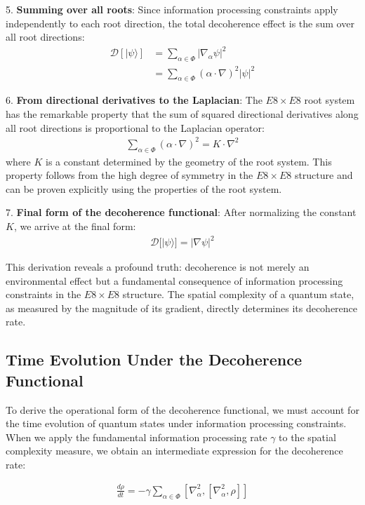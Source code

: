 \documentclass[11pt,english,twoside]{article}
\begin{document}
5. \textbf{Summing over all roots}: Since information processing constraints apply independently to each root direction, the total decoherence effect is the sum over all root directions:
   \begin{align}
   \mathcal{D}[|\psi\rangle] &= \sum_{\alpha \in \Phi} |\nabla_\alpha\psi|^2\\
   &= \sum_{\alpha \in \Phi} (\alpha \cdot \nabla)^2|\psi|^2
   \end{align}

6. \textbf{From directional derivatives to the Laplacian}: The $E8\times E8$ root system has the remarkable property that the sum of squared directional derivatives along all root directions is proportional to the Laplacian operator:
   \begin{align}
   \sum_{\alpha \in \Phi} (\alpha \cdot \nabla)^2 = K \cdot \nabla^2
   \end{align}
   where $K$ is a constant determined by the geometry of the root system. This property follows from the high degree of symmetry in the $E8\times E8$ structure and can be proven explicitly using the properties of the root system.

7. \textbf{Final form of the decoherence functional}: After normalizing the constant $K$, we arrive at the final form:
   \begin{align}
   \mathcal{D}[|\psi\rangle] = |\nabla\psi|^2
   \end{align}

This derivation reveals a profound truth: decoherence is not merely an environmental effect but a fundamental consequence of information processing constraints in the $E8\times E8$ structure. The spatial complexity of a quantum state, as measured by the magnitude of its gradient, directly determines its decoherence rate.

\subsection{Time Evolution Under the Decoherence Functional}

To derive the operational form of the decoherence functional, we must account for the time evolution of quantum states under information processing constraints. When we apply the fundamental information processing rate $\gamma$ to the spatial complexity measure, we obtain an intermediate expression for the decoherence rate:

\begin{align}
    \frac{d\rho}{dt} = -\gamma \sum_{\alpha \in \Phi} [\nabla_\alpha^2, [\nabla_\alpha^2, \rho]]
\end{align}
\end{document}
